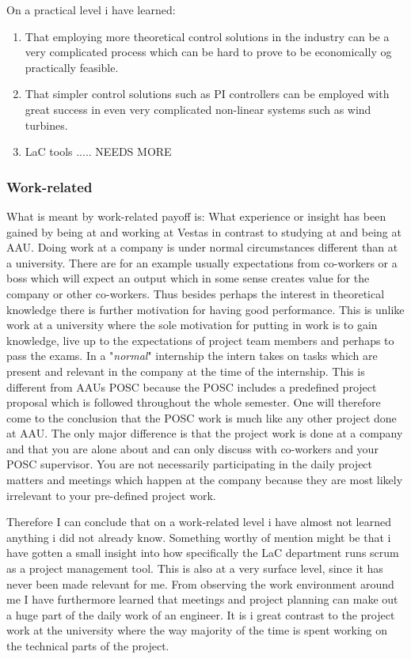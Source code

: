 On a practical level i have learned:
\begin{enumerate}
	\item That employing more theoretical control solutions in the industry can be a very complicated process which can be hard to prove to be economically og practically feasible. 
	\item That simpler control solutions such as PI controllers can be employed with great success in even very complicated non-linear systems such as wind turbines.
	\item LaC tools ..... NEEDS MORE
\end{enumerate}

\subsubsection{Work-related}
What is meant by work-related payoff is: What experience or insight has been gained by being at and working at Vestas in contrast to studying at and being at AAU. Doing work at a company is under normal circumstances different than at a university. There are for an example usually expectations from co-workers or a boss which will expect an output which in some sense creates value for the company or other co-workers. Thus besides perhaps the interest in theoretical knowledge there is further motivation for having good performance. This is unlike work at a university where the sole motivation for putting in work is to gain knowledge, live up to the expectations of project team members and perhaps to pass the exams. In a "\textit{normal}" internship the intern takes on tasks which are present and relevant in the company at the time of the internship. This is different from AAUs POSC because the POSC includes a predefined project proposal which is followed throughout the whole semester. One will therefore come to the conclusion that the POSC work is much like any other project done at AAU. The only major difference is that the project work is done at a company and that you are alone about and can only discuss with co-workers and your POSC supervisor. You are not necessarily participating in the daily project matters and meetings which happen at the company because they are most likely irrelevant to your pre-defined project work.

Therefore I can conclude that on a work-related level i have almost not learned anything i did not already know. Something worthy of mention might be that i have gotten a small insight into how specifically the LaC department runs scrum as a project management tool. This is also at a very surface level, since it has never been made relevant for me. From observing the work environment around me I have furthermore learned that meetings and project planning can make out a huge part of the daily work of an engineer. It is i great contrast to the project work at the university where the way majority of the time is spent working on the technical parts of the project.


